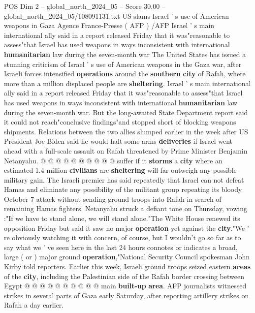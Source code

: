 \begin{textsample}{POS Dim 2 – global\_north\_2024\_05 – Score 30.00 – global\_north\_2024\_05/108091131.txt}  \label{ex:f2_pos_298}
US slams Israel ' s use of American weapons in Gaza Agence France-Presse ( AFP ) /AFP Israel ' s main international ally said in a report released Friday that it was"reasonable to assess"that Israel has used weapons in ways inconsistent with international \textbf{humanitarian} law during the seven-month war The United States has issued a stunning criticism of Israel ' s use of American weapons in the Gaza war, after Israeli forces intensified \textbf{operations} around the \textbf{southern} \textbf{city} of Rafah, where more than a million displaced people are \textbf{sheltering}.
Israel ' s main international ally said in a report released Friday that it was"reasonable to assess"that Israel has used weapons in ways inconsistent with international \textbf{humanitarian} law during the seven-month war.
But the long-awaited State Department report said it could not reach"conclusive findings"and stopped short of blocking weapons shipments.
Relations between the two allies slumped earlier in the week after US President Joe Biden said he would halt some arms \textbf{deliveries} if Israel went ahead with a full-scale assault on Rafah threatened by Prime Minister Benjamin Netanyahu. @ @ @ @ @ @ @ @ @ @ suffer if it \textbf{storms} a \textbf{city} where an estimated 1.4 million \textbf{civilians} are \textbf{sheltering} will far outweigh any possible military gain.
The Israeli premier has said repeatedly that Israel can not defeat Hamas and eliminate any possibility of the militant group repeating its bloody October 7 attack without sending ground troops into Rafah in search of remaining Hamas fighters.
Netanyahu struck a defiant tone on Thursday, vowing :"If we have to stand alone, we will stand alone."The White House renewed its opposition Friday but said it saw no major \textbf{operation} yet against the \textbf{city}."We ' re obviously watching it with concern, of course, but I wouldn't go so far as to say what we ' ve seen here in the last 24 hours connotes or indicates a broad, large ( or ) major ground \textbf{operation},"National Security Council spokesman John Kirby told reporters.
Earlier this week, Israeli ground troops seized eastern \textbf{areas} of the \textbf{city}, including the Palestinian side of the Rafah border crossing between Egypt @ @ @ @ @ @ @ @ @ @ main \textbf{built-up} \textbf{area}.
AFP journalists witnessed strikes in several parts of Gaza early Saturday, after reporting artillery strikes on Rafah a day earlier.

\end{textsample}
